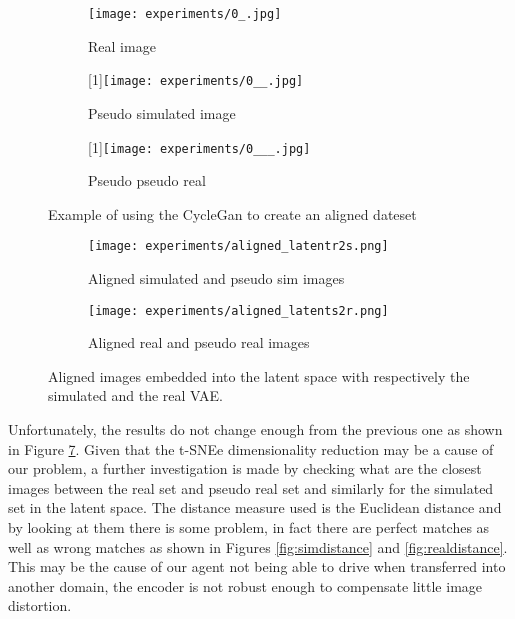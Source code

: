 \begin{figure}[h]
  \centering
  \begin{subfigure}{.33\linewidth}
      \centering
      \texttt{[image: experiments/0\_.jpg]}
      \caption{Real image}\label{fig:real}
  \end{subfigure}%
      \hfill
  \begin{subfigure}{.33\linewidth}
      \centering
      \scalebox{-1}[1]{\texttt{[image: experiments/0\_\_.jpg]}}
      \caption{Pseudo simulated image}\label{fig:psim}
  \end{subfigure}%
  \hfill
  \begin{subfigure}{.33\linewidth}
    \centering
    \scalebox{-1}[1]{\texttt{[image: experiments/0\_\_\_.jpg]}}
    \caption{Pseudo pseudo real}\label{fig:ppreal}
  \end{subfigure} 
  \caption{Example of using the CycleGan to create an aligned dateset}
  \label{fig:examplealigned}
\end{figure}

\begin{figure}[h]
  \centering
  \begin{subfigure}{.5\linewidth}
      \centering
      \texttt{[image: experiments/aligned\_latentr2s.png]}
      \caption{Aligned simulated and pseudo sim images}\label{fig:aligen_latentr2s}
  \end{subfigure}%
      \hfill
  \begin{subfigure}{.5\linewidth}
      \centering
      \texttt{[image: experiments/aligned\_latents2r.png]}
      \caption{Aligned real and pseudo real images}\label{fig:aligen_latents2r}
  \end{subfigure}
  \caption{Aligned images embedded into the latent space with respectively the simulated and the real VAE.}
  \label{fig:latentpseudoaligned}
\end{figure}

Unfortunately, the results do not change enough from the previous one as shown in Figure \ref{fig:latentpseudoaligned}. Given that the t-SNEe dimensionality reduction may be a cause of our problem, a further investigation is made by checking what are the closest images between the real set and pseudo real set and similarly for the simulated set in the latent space. The distance measure used is the Euclidean distance and by looking at them there is some problem, in fact there are perfect matches as well as wrong matches as shown in Figures \ref{fig:simdistance} and \ref{fig:realdistance}. This may be the cause of our agent not being able to drive when transferred into another domain, the encoder is not robust enough to compensate little image distortion.

